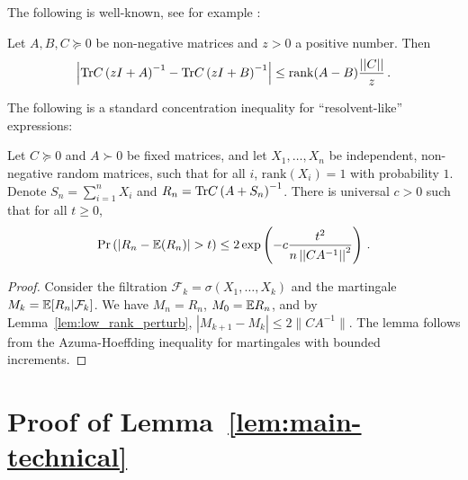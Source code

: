 \documentclass[times,sort&compress,3p]{elsarticle}
\begin{document}
The following is well-known, see for example \cite[Lemma 4]{couillet2014robust}:
\begin{lemma}
        \label{lem:low_rank_perturb}
        Let $A,B,C \succeq 0$ be non-negative matrices and $z>0$ a positive number. Then
        \begin{equation}
        \left \vert  \textrm{Tr} C\left( zI+A \right)^{-1} - \textrm{Tr} C\left( zI+B \right)^{-1}    \right \vert \le \mathrm{rank}(A-B)\frac{\left|\left| C \right|\right|}{z} \,.
        \end{equation} 
\end{lemma}

The following is a standard concentration inequality for ``resolvent-like'' expressions:
\begin{lemma}
        \label{lem:resolvent-conc}
        Let $C \succeq 0$ and $A\succ 0$ be fixed matrices, and let $X_1,\ldots,X_n$ be independent, non-negative random matrices, such that for all $i$, $\mathrm{rank}(X_i)=1$ with probability $1$. Denote $S_n = \sum_{i=1}^{n}X_i$ and $R_n =  \textrm{Tr} C\left( A + S_n\right)^{-1}$.
        There is universal $c>0$ such that for all $t\ge 0$, 
        \begin{equation}
                \Pr \left(  \left \vert R_n-{\mathbb{E}}(R_n) \right \vert>t \right) \le 2\exp\left(-c\frac{t^2}{n\left|\left| CA^{-1} \right|\right|^2}\right) \,.
        \end{equation}
\end{lemma}
\begin{proof}
    Consider the filtration $\mathcal{F}_k=\sigma(X_1,\ldots,X_k)$ and the martingale $M_k={\mathbb{E}}[R_n|\mathcal{F}_k]$. We have $M_n=R_n$, $M_0={\mathbb{E}} R_n$, and by Lemma~\ref{lem:low_rank_perturb}, $|M_{k+1}-M_k| \le 2\|CA^{-1}\|$. 
    The lemma follows from the Azuma-Hoeffding inequality for martingales with bounded increments.
\end{proof}


\section{Proof of Lemma~\ref{lem:main-technical}}
\label{sec:proof-lem:main-technical}
\end{document}
